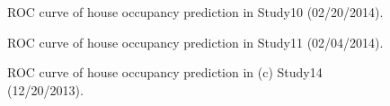 \begin{figure}[h]
	\caption{
	ROC curve of house occupancy prediction in Study10 (02/20/2014).}
	\label{fig_rocresults_1}
\end{figure}

\begin{figure}[h]
	\caption{
	ROC curve of house occupancy prediction in Study11 (02/04/2014).
}
	\label{fig_rocresults_2}
\end{figure}

\begin{figure}[h]
	\caption{
	ROC curve of house occupancy prediction in (c) Study14 (12/20/2013).
}
	\label{fig_rocresults_3}
\end{figure}